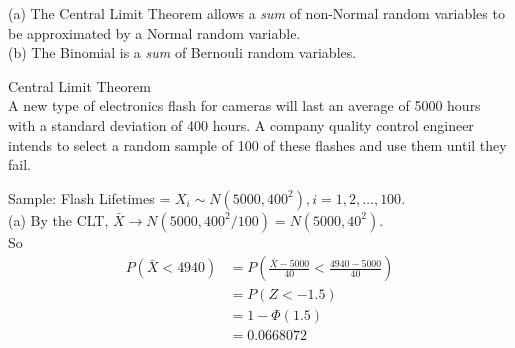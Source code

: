 \documentclass[bigtut]{tutorial}\usepackage[]{graphicx}\usepackage[]{color}
\begin{document}
\begin{tutorial}
\begin{questions}
\begin{parts}
\end{parts}


\begin{solution}
(a)
The Central Limit Theorem allows a {\it sum} of non-Normal random variables to be approximated by a Normal random variable. \\

(b)
The Binomial is a {\it sum} of Bernouli random variables.

\end{solution}




\question  Central Limit Theorem  \\

A new type of electronics flash for cameras will last an
average
    of 5000 hours with a standard deviation of 400 hours. A company
    quality control engineer intends to select a random sample of 100 of
    these flashes and use them until they fail.  \\



 \begin{solution}
Sample: Flash Lifetimes =  $X_{i} \sim N(5000, 400^2), i=1,2,\ldots, 100$. \\

(a)  
By the CLT,  $\bar{X} \rightarrow N( 5000, 400^2/100) = N( 5000, 40^2)$. \\

So \begin{align*}
 P( \bar{X}  < 4940)  & =  P( \frac{ \bar{X} - 5000}{40}  < \frac{4940-5000}{40} ) \\
& = P(Z < -1.5) \\
& = 1-\Phi(1.5) \\
& =  0.0668072
\end{align*}


\end{solution}
\end{questions}
\end{tutorial}
\end{document}
